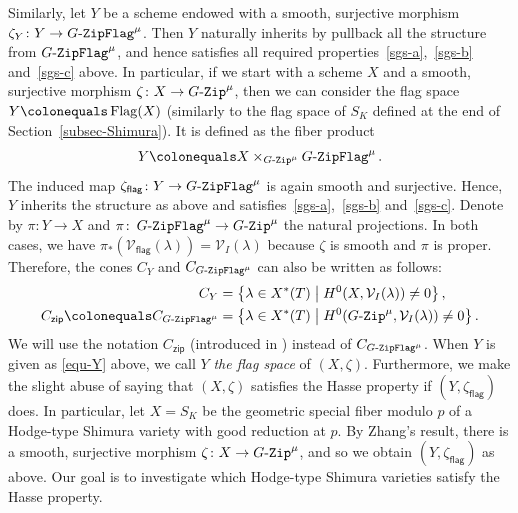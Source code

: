 \documentclass[11pt]{amsart}
\numberwithin{equation}{section}
\theoremstyle{definition}
\theoremstyle{remark}
\newcommand{\GZip}{\mathop{\text{$G$-{\tt Zip}}}\nolimits}
\newcommand{\zipsf}{\mathsf{zip}}
\newcommand{\flag}{\mathsf{flag}}
\newcommand{\GF}{\mathop{\text{$G$-{\tt ZipFlag}}}\nolimits}
\newcommand{\Vcal}{{\mathcal V}}
\DeclareMathOperator{\Flag}{Flag}
\newcommand{\relmiddle}[1]{\mathrel{}\middle#1\mathrel{}}
\begin{document}
Similarly, let $Y$ be a scheme endowed with a smooth, surjective morphism $\zeta_{Y} \colon Y\to \GF^{\mu}$. Then $Y$ naturally inherits  by pullback all the structure from $\GF^{\mu}$, and hence satisfies all required properties~\eqref{sgs-a},~\eqref{sgs-b} and~\eqref{sgs-c}  above. In particular, if we start with a scheme $X$ and a smooth, surjective morphism $\zeta \colon X\to \GZip^\mu$, then we can consider the flag space $Y\colonequals\Flag(X)$ (similarly to the flag space of $S_K$ defined at the end of Section~\ref{subsec-Shimura}). It is defined as the fiber product
\begin{equation}\label{equ-Y}
    Y \colonequals X\times_{\GZip^\mu} \GF^{\mu}.
\end{equation}
The induced map $\zeta_{\flag} \colon Y\to \GF^{\mu}$ is again smooth and surjective. Hence, $Y$ inherits the structure as above and satisfies~\eqref{sgs-a},~\eqref{sgs-b} and~\eqref{sgs-c}. Denote by $\pi \colon Y\to X$ and $\pi \colon \GF^{\mu}\to \GZip^\mu$ the natural projections. In both cases, we have $\pi_{*}(\Vcal_{\flag}(\lambda))=\Vcal_I(\lambda)$ because $\zeta$ is smooth and $\pi$ is proper. Therefore, the cones $C_Y$ and $C_{\GF^{\mu}}$ can also be written as follows:
\begin{align}
    C_Y&=\left\{\lambda\in X^*(T) \relmiddle| H^0(X,\Vcal_I(\lambda))\neq 0\right\}, \label{equ-CY-Vlambda}  \\
    C_{\zipsf} \colonequals C_{\GF^{\mu}} &= \left\{\lambda\in X^*(T)\relmiddle| H^0(\GZip^\mu,\Vcal_I(\lambda))\neq 0\right\}. \label{equ-CZip}
\end{align}
We will use the notation $C_{\zipsf}$ (introduced in \cite{Koskivirta-automforms-GZip}) instead of $C_{\GF^{\mu}}$. When $Y$ is given as \eqref{equ-Y} above, we call $Y$ \emph{the flag space} of $(X,\zeta)$. Furthermore, we make the slight abuse of saying that $(X,\zeta)$ satisfies the Hasse property if $(Y,\zeta_{\flag})$ does. In particular, let $X=S_K$ be the geometric special fiber modulo $p$ of a Hodge-type Shimura variety with good reduction at $p$. By Zhang's result, there is a smooth, surjective morphism $\zeta \colon X\to \GZip^\mu$, and so we obtain $(Y,\zeta_{\flag})$ as above. Our goal is to investigate which Hodge-type Shimura varieties satisfy the Hasse property. 
\end{document}
